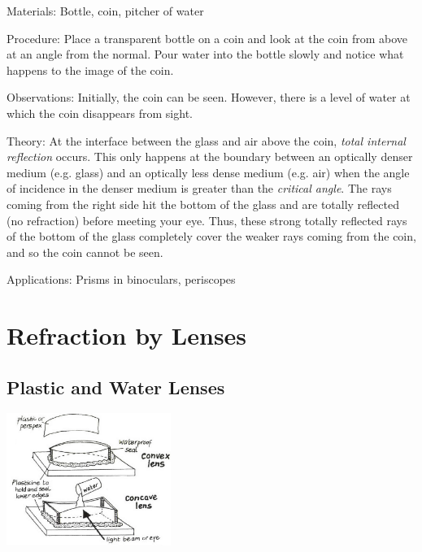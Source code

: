 \begin{multicols}{2}
\begin{description*}
\item[Materials:]{Bottle, coin, pitcher of water}
\item[Procedure:]{Place a transparent bottle on a coin and look at the coin from above at an angle from the normal. Pour water into the bottle slowly and notice what happens to the image of the coin.}
\item[Observations:]{Initially, the coin can be seen. However, there is a level of water at which the coin disappears from sight.}
\item[Theory:]{At the interface between the glass and air above the coin, \emph{total internal reflection} occurs. This only happens at the boundary between an optically denser medium (e.g. glass) and an optically less dense medium (e.g. air) when the angle of incidence in the denser medium is greater than the \emph{critical angle}. The rays coming from the right side hit the bottom of the glass and are totally reflected (no refraction) before meeting your eye. Thus, these strong totally reflected rays of the bottom of the glass completely cover the weaker rays coming from the coin, and so the coin cannot be seen.}
\item[Applications:]{Prisms in binoculars, periscopes}
\end{description*}


\section*{Refraction by Lenses}


\subsection{Plastic and Water Lenses}

\begin{center}
\includegraphics[width=0.4\textwidth]{./img/vso/lenses.png}
\end{center}


\end{multicols}
